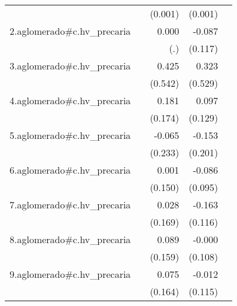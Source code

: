 {\begin{longtable}{l*{4}{D{.}{.}{-1}}}
            &                     &     (0.001)         &     (0.001)         &                     \\
\addlinespace
2.aglomerado#c.hv\_precaria&                     &       0.000         &      -0.087         &                     \\
            &                     &         (.)         &     (0.117)         &                     \\
\addlinespace
3.aglomerado#c.hv\_precaria&                     &       0.425         &       0.323         &                     \\
            &                     &     (0.542)         &     (0.529)         &                     \\
\addlinespace
4.aglomerado#c.hv\_precaria&                     &       0.181         &       0.097         &                     \\
            &                     &     (0.174)         &     (0.129)         &                     \\
\addlinespace
5.aglomerado#c.hv\_precaria&                     &      -0.065         &      -0.153         &                     \\
            &                     &     (0.233)         &     (0.201)         &                     \\
\addlinespace
6.aglomerado#c.hv\_precaria&                     &       0.001         &      -0.086         &                     \\
            &                     &     (0.150)         &     (0.095)         &                     \\
\addlinespace
7.aglomerado#c.hv\_precaria&                     &       0.028         &      -0.163         &                     \\
            &                     &     (0.169)         &     (0.116)         &                     \\
\addlinespace
8.aglomerado#c.hv\_precaria&                     &       0.089         &      -0.000         &                     \\
            &                     &     (0.159)         &     (0.108)         &                     \\
\addlinespace
9.aglomerado#c.hv\_precaria&                     &       0.075         &      -0.012         &                     \\
            &                     &     (0.164)         &     (0.115)         &                     \\

\end{longtable}}
